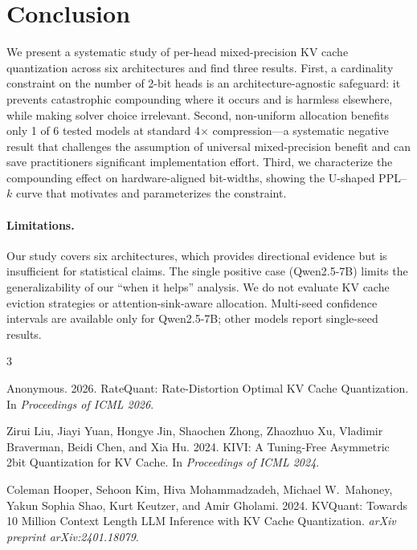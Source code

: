 \documentclass[11pt,a4paper]{article}
\begin{document}
\section{Conclusion}

We present a systematic study of per-head mixed-precision KV cache quantization across six architectures and find three results.
First, a cardinality constraint on the number of 2-bit heads is an architecture-agnostic safeguard: it prevents catastrophic compounding where it occurs and is harmless elsewhere, while making solver choice irrelevant.
Second, non-uniform allocation benefits only 1 of 6 tested models at standard 4$\times$ compression---a systematic negative result that challenges the assumption of universal mixed-precision benefit and can save practitioners significant implementation effort.
Third, we characterize the compounding effect on hardware-aligned bit-widths, showing the U-shaped PPL--$k$ curve that motivates and parameterizes the constraint.

\paragraph{Limitations.}
Our study covers six architectures, which provides directional evidence but is insufficient for statistical claims.
The single positive case (Qwen2.5-7B) limits the generalizability of our ``when it helps'' analysis.
We do not evaluate KV cache eviction strategies or attention-sink-aware allocation.
Multi-seed confidence intervals are available only for Qwen2.5-7B; other models report single-seed results.

\begin{thebibliography}{3}

Anonymous. 2026.
{RateQuant: Rate-Distortion Optimal KV Cache Quantization}.
In \emph{Proceedings of ICML 2026}.

Zirui Liu, Jiayi Yuan, Hongye Jin, Shaochen Zhong, Zhaozhuo Xu, Vladimir Braverman, Beidi Chen, and Xia Hu. 2024.
{KIVI: A Tuning-Free Asymmetric 2bit Quantization for KV Cache}.
In \emph{Proceedings of ICML 2024}.

Coleman Hooper, Sehoon Kim, Hiva Mohammadzadeh, Michael W.\ Mahoney, Yakun Sophia Shao, Kurt Keutzer, and Amir Gholami. 2024.
{KVQuant: Towards 10 Million Context Length LLM Inference with KV Cache Quantization}.
\emph{arXiv preprint arXiv:2401.18079}.

\end{thebibliography}
\end{document}
